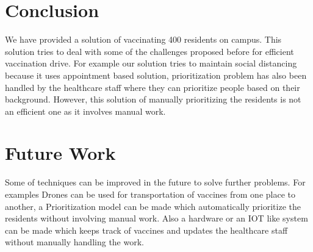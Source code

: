 \documentclass[10pt,twocolumn,letterpaper]{article}
\begin{document}
\section{Conclusion}
We have provided a solution of vaccinating 400 residents on campus. This solution tries to deal with some of the challenges proposed before for efficient vaccination drive. For example our solution tries to maintain social distancing because it uses appointment based solution, prioritization problem has also been handled by the healthcare staff where they can prioritize people based on their background. However, this solution of manually prioritizing the residents is not an efficient one as it involves manual work.

\section{Future Work}
Some of techniques can be improved in the future to solve further problems. For examples Drones can be used for transportation of vaccines from one place to another, a Prioritization model can be made which automatically prioritize the residents without involving manual work. Also a hardware or an IOT like system can be made which keeps track of vaccines and updates the healthcare staff without manually handling the work.

{\small


}
\end{document}
